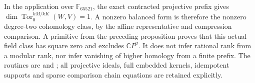 \begin{remark}
\label{C:act-projective-square-certificate-scope}
In the application over $\mathbb F_{65521}$, the exact contracted
projective prefix gives
$\dim\operatorname{Tor}_0^{kM/kK}(W,V)=1$.
A nonzero balanced form is therefore the nonzero degree-two
cohomology class, by the affine representative and compression
comparison.  A primitive from the preceding proposition proves
that this actual field class has square zero and excludes
$\mathbb CP^2$.  It does not infer rational rank from a modular
rank, nor infer vanishing of higher homology from a finite prefix.
The routines are
 and
; all projective ideals, full
embedded kernels, idempotent supports and sparse comparison chain
equations are retained explicitly.
\end{remark}
